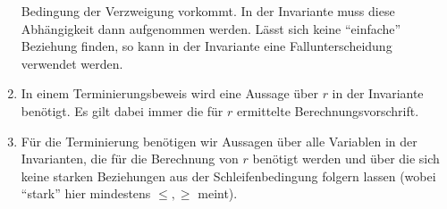\documentclass[a4paper,8pt,landscape]{extarticle}
\begin{document}
\begin{multicols*}{3}
\begin{enumerate}
Bedingung der Verzweigung vorkommt. In der Invariante muss
diese Abhängigkeit dann aufgenommen werden. Lässt sich keine
“einfache” Beziehung finden, so kann in der Invariante eine
Fallunterscheidung verwendet werden.
      \item In einem Terminierungsbeweis wird eine Aussage über $r$ in der
Invariante benötigt. Es gilt dabei immer die für $r$ ermittelte
Berechnungsvorschrift.
      \item Für die Terminierung benötigen wir Aussagen über alle Variablen in
der Invarianten, die für die Berechnung von $r$ benötigt werden und
über die sich keine starken Beziehungen aus der Schleifenbedingung
folgern lassen (wobei “stark” hier mindestens $\leq, \geq$ meint).
    \end{enumerate}

    
  \end{multicols*}
\end{document}
